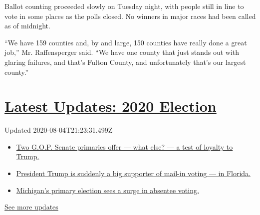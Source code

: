 Ballot counting proceeded slowly on Tuesday night, with people still in
line to vote in some places as the polls closed. No winners in major
races had been called as of midnight.

``We have 159 counties and, by and large, 150 counties have really done
a great job,'' Mr. Raffensperger said. ``We have one county that just
stands out with glaring failures, and that's Fulton County, and
unfortunately that's our largest county.''

\hypertarget{latest-updates-2020-election}{%
\section{\texorpdfstring{\href{https://www.nytimes3xbfgragh.onion/2020/08/04/us/elections/primary-election-michigan-arizona-kansas.html?action=click\&pgtype=Article\&state=default\&region=MAIN_CONTENT_1\&context=storylines_live_updates}{Latest
Updates: 2020
Election}}{Latest Updates: 2020 Election}}\label{latest-updates-2020-election}}

Updated 2020-08-04T21:23:31.499Z

\begin{itemize}
\tightlist
\item
  \href{https://www.nytimes3xbfgragh.onion/2020/08/04/us/elections/primary-election-michigan-arizona-kansas.html?action=click\&pgtype=Article\&state=default\&region=MAIN_CONTENT_1\&context=storylines_live_updates\#link-3924dd44}{Two
  G.O.P. Senate primaries offer --- what else? --- a test of loyalty to
  Trump.}
\item
  \href{https://www.nytimes3xbfgragh.onion/2020/08/04/us/elections/primary-election-michigan-arizona-kansas.html?action=click\&pgtype=Article\&state=default\&region=MAIN_CONTENT_1\&context=storylines_live_updates\#link-32b39e33}{President
  Trump is suddenly a big supporter of mail-in voting --- in Florida.}
\item
  \href{https://www.nytimes3xbfgragh.onion/2020/08/04/us/elections/primary-election-michigan-arizona-kansas.html?action=click\&pgtype=Article\&state=default\&region=MAIN_CONTENT_1\&context=storylines_live_updates\#link-ab1004d}{Michigan's
  primary election sees a surge in absentee voting.}
\end{itemize}

\href{https://www.nytimes3xbfgragh.onion/2020/08/04/us/elections/primary-election-michigan-arizona-kansas.html?action=click\&pgtype=Article\&state=default\&region=MAIN_CONTENT_1\&context=storylines_live_updates}{See
more updates}

